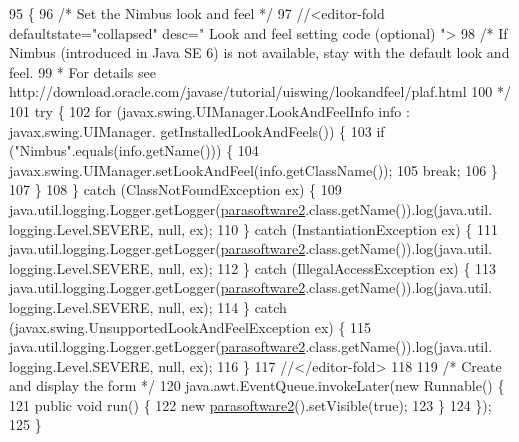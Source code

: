 \begin{DoxyCode}
95                                            \{
96         \textcolor{comment}{/* Set the Nimbus look and feel */}
97         \textcolor{comment}{//<editor-fold defaultstate="collapsed" desc=" Look and feel setting code (optional) ">}
98         \textcolor{comment}{/* If Nimbus (introduced in Java SE 6) is not available, stay with the default look and feel.}
99 \textcolor{comment}{         * For details see http://download.oracle.com/javase/tutorial/uiswing/lookandfeel/plaf.html }
100 \textcolor{comment}{         */}
101         \textcolor{keywordflow}{try} \{
102             \textcolor{keywordflow}{for} (javax.swing.UIManager.LookAndFeelInfo info : javax.swing.UIManager.
      getInstalledLookAndFeels()) \{
103                 \textcolor{keywordflow}{if} (\textcolor{stringliteral}{"Nimbus"}.equals(info.getName())) \{
104                     javax.swing.UIManager.setLookAndFeel(info.getClassName());
105                     \textcolor{keywordflow}{break};
106                 \}
107             \}
108         \} \textcolor{keywordflow}{catch} (ClassNotFoundException ex) \{
109             java.util.logging.Logger.getLogger(\mbox{\hyperlink{classsoftware_1_1parasoftware2_aea2b7cefcabec93c2336af7adbc539cd}{parasoftware2}}.class.getName()).log(java.util.
      logging.Level.SEVERE, null, ex);
110         \} \textcolor{keywordflow}{catch} (InstantiationException ex) \{
111             java.util.logging.Logger.getLogger(\mbox{\hyperlink{classsoftware_1_1parasoftware2_aea2b7cefcabec93c2336af7adbc539cd}{parasoftware2}}.class.getName()).log(java.util.
      logging.Level.SEVERE, null, ex);
112         \} \textcolor{keywordflow}{catch} (IllegalAccessException ex) \{
113             java.util.logging.Logger.getLogger(\mbox{\hyperlink{classsoftware_1_1parasoftware2_aea2b7cefcabec93c2336af7adbc539cd}{parasoftware2}}.class.getName()).log(java.util.
      logging.Level.SEVERE, null, ex);
114         \} \textcolor{keywordflow}{catch} (javax.swing.UnsupportedLookAndFeelException ex) \{
115             java.util.logging.Logger.getLogger(\mbox{\hyperlink{classsoftware_1_1parasoftware2_aea2b7cefcabec93c2336af7adbc539cd}{parasoftware2}}.class.getName()).log(java.util.
      logging.Level.SEVERE, null, ex);
116         \}
117         \textcolor{comment}{//</editor-fold>}
118 
119         \textcolor{comment}{/* Create and display the form */}
120         java.awt.EventQueue.invokeLater(\textcolor{keyword}{new} Runnable() \{
121             \textcolor{keyword}{public} \textcolor{keywordtype}{void} run() \{
122                 \textcolor{keyword}{new} \mbox{\hyperlink{classsoftware_1_1parasoftware2_aea2b7cefcabec93c2336af7adbc539cd}{parasoftware2}}().setVisible(\textcolor{keyword}{true});
123             \}
124         \});
125     \}
\end{DoxyCode}


